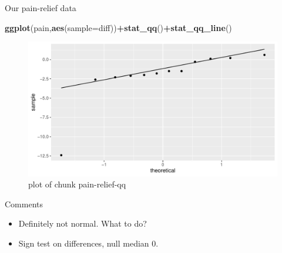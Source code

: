 \documentclass[
  ignorenonframetext,
]{beamer}
\newenvironment{Shaded}{\begin{snugshade}}{\end{snugshade}}
\newcommand{\DataTypeTok}[1]{\textcolor[rgb]{0.13,0.29,0.53}{#1}}
\newcommand{\KeywordTok}[1]{\textcolor[rgb]{0.13,0.29,0.53}{\textbf{#1}}}
\newcommand{\NormalTok}[1]{#1}
\newcommand{\OperatorTok}[1]{\textcolor[rgb]{0.81,0.36,0.00}{\textbf{#1}}}
\providecommand{\tightlist}{%
  \setlength{\itemsep}{0pt}\setlength{\parskip}{0pt}}
\begin{document}
\begin{frame}[fragile]{Our pain-relief data}
\protect\hypertarget{our-pain-relief-data}{}

\begin{Shaded}
\begin{Highlighting}[]
\KeywordTok{ggplot}\NormalTok{(pain,}\KeywordTok{aes}\NormalTok{(}\DataTypeTok{sample=}\NormalTok{diff))}\OperatorTok{+}\KeywordTok{stat_qq}\NormalTok{()}\OperatorTok{+}\KeywordTok{stat_qq_line}\NormalTok{()}
\end{Highlighting}
\end{Shaded}

\begin{figure}
\centering
\includegraphics{figure/pain-relief-qq-1.pdf}
\caption{plot of chunk pain-relief-qq}
\end{figure}

\end{frame}

\begin{frame}{Comments}
\protect\hypertarget{comments-6}{}

\begin{itemize}
\tightlist
\item
  Definitely not normal. What to do?
\item
  Sign test on differences, null median 0.
\end{itemize}

\end{frame}
\end{document}
